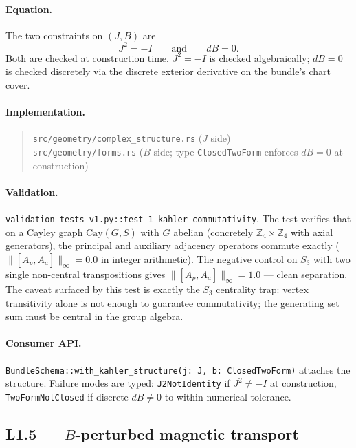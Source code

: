 \documentclass[11pt,letterpaper]{article}
\begin{document}
\paragraph{Equation.}
The two constraints on $(J, B)$ are
\[
J^2 = -I \qquad \text{and} \qquad dB = 0.
\]
Both are checked at construction time. $J^2 = -I$ is checked
algebraically; $dB = 0$ is checked discretely via the discrete
exterior derivative on the bundle's chart cover.

\paragraph{Implementation.}
\begin{quote}
\sloppy
\texttt{src/geometry/complex\_structure.rs} ($J$ side) \\
\texttt{src/geometry/forms.rs} ($B$ side; type
\texttt{ClosedTwoForm} enforces $dB = 0$ at construction)
\end{quote}

\paragraph{Validation.}
\texttt{validation\_tests\_v1.py::test\_1\_kahler\_commutativity}.
The test verifies that on a Cayley graph $\mathrm{Cay}(G, S)$ with
$G$ abelian (concretely $\mathbb{Z}_4 \times \mathbb{Z}_4$ with axial
generators), the principal and auxiliary adjacency operators
commute exactly ($\|[A_p, A_a]\|_\infty = 0.0$ in integer
arithmetic). The negative control on $S_3$ with two single
non-central transpositions gives $\|[A_p, A_a]\|_\infty = 1.0$ ---
clean separation. The caveat surfaced by this test is exactly the
$S_3$ centrality trap: vertex transitivity alone is not enough to
guarantee commutativity; the generating set sum must be central in
the group algebra.

\paragraph{Consumer API.}
\verb|BundleSchema::with_kahler_structure(j: J, b: ClosedTwoForm)|
attaches the structure. Failure modes are typed:
\verb|J2NotIdentity| if $J^2 \neq -I$ at construction,
\verb|TwoFormNotClosed| if discrete $dB \neq 0$ to within numerical
tolerance.


\subsection{L1.5 --- $B$-perturbed magnetic transport}
\end{document}
